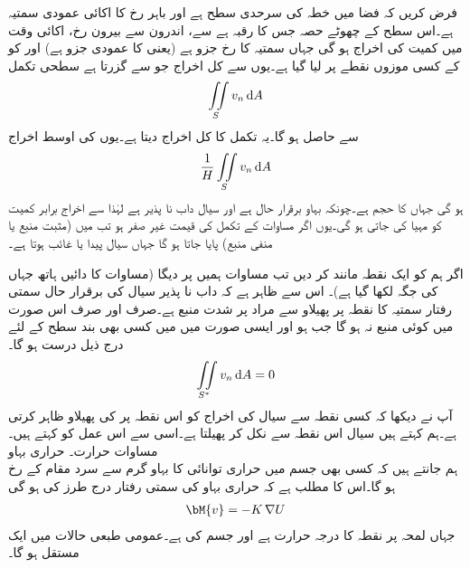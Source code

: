 فرض کریں کہ فضا میں خطہ  کی سرحدی سطح  ہے اور  باہر رخ  کا اکائی عمودی سمتیہ ہے۔اس سطح کے چھوٹے حصہ  جس کا رقبہ  ہے سے،  اندرون  سے بیرون   رخ، اکائی وقت میں کمیت کی اخراج  ہو گی جہاں  سمتیہ  کا   رخ جزو ہے (یعنی  کا عمودی جزو ہے) اور  کو  کے کسی موزوں نقطے پر لیا گیا ہے۔یوں  سے کل اخراج جو  سے گزرتا ہے سطحی تکمل
\begin{align*}
\iint\limits_S v_n \dif A
\end{align*}
سے حاصل ہو گا۔یہ تکمل  کا کل اخراج دیتا ہے۔یوں  کی اوسط اخراج
\begin{align}\label{مساوات_خطی_تکمل_پھیلاو_مثال_ت}
\frac{1}{H}\iint\limits_S v_n\dif A
\end{align}
ہو گی جہاں  کا حجم  ہے۔چونکہ بہاو برقرار حال ہے اور سیال داب نا پذیر ہے لہٰذا  سے  اخراج برابر کمیت  کو  مہیا کی جاتی ہو گی۔یوں اگر مساوات  کے تکمل کی قیمت غیر صفر ہو تب  میں  (مثبت منبع یا منفی منبع) پایا جاتا ہو گا جہاں سیال پیدا یا غائب ہوتا ہے۔

اگر ہم  کو ایک نقطہ  مانند کر دیں تب  مساوات  ہمیں  پر  دیگا (مساوات  کا دائیں ہاتھ جہاں  کی جگہ  لکھا گیا ہے)۔ اس سے ظاہر ہے کہ داب نا پذیر سیال کی برقرار حال سمتی رفتار سمتیہ  کا نقطہ  پر پھیلاو سے مراد  پر شدت منبع ہے۔صرف اور صرف اس صورت  میں کوئی منبع نہ ہو گا جب  ہو اور ایسی صورت میں  میں کسی بھی بند سطح  کے لئے درج ذیل درست ہو گا۔
\begin{align*}
\iint\limits_{S^*}v_n\dif A=0
\end{align*}
آپ نے دیکھا کہ  کسی نقطہ سے سیال کی اخراج کو اس نقطہ پر  کی پھیلاو ظاہر کرتی ہے۔ہم کہتے ہیں سیال اس نقطہ سے نکل کر پھیلتا ہے۔اسی سے اس عمل کو  کہتے ہیں۔ 
\quad مساوات حرارت۔ حراری بہاو\\
ہم جانتے ہیں کہ کسی بھی جسم میں حراری توانائی کا بہاو  گرم سے سرد مقام کے رخ  ہو گا۔اس کا مطلب ہے کہ حراری بہاو کی سمتی رفتار  درج طرز کی ہو گی
\begin{align}\label{مساوات_خطی_تکمل_حراری_اخراج_الف}
\bM{v}=-K\,\nabla U
\end{align}
جہاں  لمحہ  پر نقطہ  کا درجہ حرارت ہے اور  جسم کی  ہے۔عمومی طبعی حالات میں  ایک مستقل ہو گا۔
 
